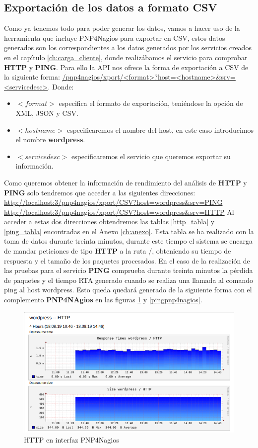 \subsection{Exportación de los datos a formato CSV}
Como ya tenemos todo para poder generar los datos, vamos a hacer uso de la herramienta que incluye PNP4Nagios para exportar en CSV, estos datos generados son los correspondientes a los datos generados por los servicios creados en el capítulo \ref{ch:carga_cliente}, donde realizábamos el servicio para comprobar \textbf{HTTP} y \textbf{PING}. 
Para ello la API \cite{exportcsv} nos ofrece la forma de exportación a CSV de la siguiente forma:
\url{/pnp4nagios/xport/<format>?host=<hostname>&srv=<servicedesc>}.
Donde:
\begin{itemize}
	\item \textbf{$<format>$} especifica el formato de exportación, teniéndose la opción de XML, JSON y CSV.
	\item \textbf{$<hostname>$} especificaremos el nombre del host, en este caso introducimos el nombre \textbf{wordpress}.
	\item \textbf{$<servicedesc>$} especificaremos el servicio que queremos exportar su información.	
\end{itemize}
Como queremos obtener la información de rendimiento del análisis de \textbf{HTTP} y \textbf{PING} solo tendremos que acceder a las siguientes direcciones:
\url{http://localhost:3/pnp4nagios/xport/CSV?host=wordpress&srv=PING}
\url{http://localhost:3/pnp4nagios/xport/CSV?host=wordpress&srv=HTTP}
Al acceder a estas dos direcciones obtendremos las tablas \ref{http_tabla} y \ref{ping_tabla} encontradas en el Anexo \ref{ch:anexo}.
Esta tabla se ha realizado con la toma de datos durante treinta minutos, durante este tiempo el sistema se encarga de mandar peticiones de tipo \textbf{HTTP} a la ruta /, obteniendo su tiempo de respuesta y el tamaño de los paquetes procesados. En el caso de la realización de las pruebas para el servicio \textbf{PING} comprueba durante treinta minutos la pérdida de paquetes y el tiempo RTA generado cuando se realiza una llamada al comando ping al host wordpress.
Esto queda quedará generado de la siguiente forma con el complemento \textbf{PNP4NAgios} en las figuras \ref{httppnp4nagios} y \ref{pingpnp4nagios}.
\newpage
\begin{figure}[H]
	\centering
	\includegraphics[scale=0.5]{imagenes/modelado/http.png}
	\caption{HTTP en interfaz PNP4Nagios} \label{httppnp4nagios}
\end{figure}
